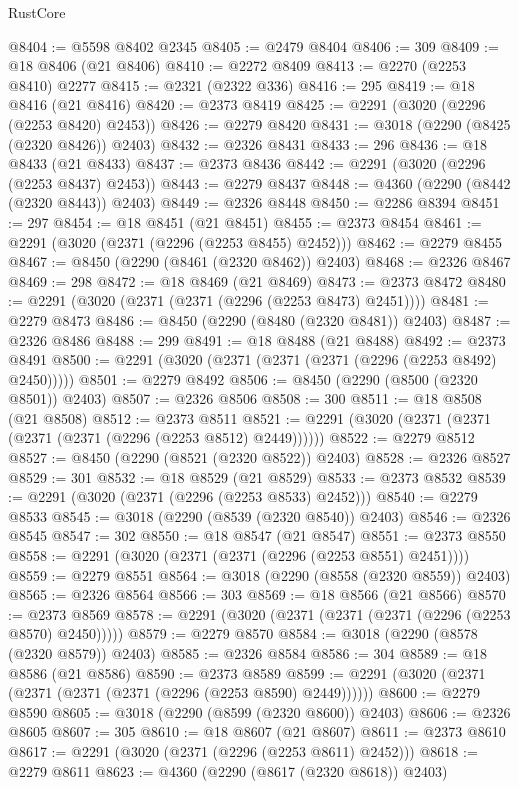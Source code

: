 \begin{lexlean}{RustCore}
\begin{coremodule}
@8404 := @5598 @8402 @2345
@8405 := @2479 @8404
@8406 := 309
@8409 := @18 @8406 (@21 @8406)
@8410 := @2272 @8409
@8413 := @2270 (@2253 @8410) @2277
@8415 := @2321 (@2322 @336)
@8416 := 295
@8419 := @18 @8416 (@21 @8416)
@8420 := @2373 @8419
@8425 := @2291 (@3020 (@2296 (@2253 @8420) @2453))
@8426 := @2279 @8420
@8431 := @3018 (@2290 (@8425 (@2320 @8426)) @2403)
@8432 := @2326 @8431
@8433 := 296
@8436 := @18 @8433 (@21 @8433)
@8437 := @2373 @8436
@8442 := @2291 (@3020 (@2296 (@2253 @8437) @2453))
@8443 := @2279 @8437
@8448 := @4360 (@2290 (@8442 (@2320 @8443)) @2403)
@8449 := @2326 @8448
@8450 := @2286 @8394
@8451 := 297
@8454 := @18 @8451 (@21 @8451)
@8455 := @2373 @8454
@8461 := @2291 (@3020 (@2371 (@2296 (@2253 @8455) @2452)))
@8462 := @2279 @8455
@8467 := @8450 (@2290 (@8461 (@2320 @8462)) @2403)
@8468 := @2326 @8467
@8469 := 298
@8472 := @18 @8469 (@21 @8469)
@8473 := @2373 @8472
@8480 := @2291 (@3020 (@2371 (@2371 (@2296 (@2253 @8473) @2451))))
@8481 := @2279 @8473
@8486 := @8450 (@2290 (@8480 (@2320 @8481)) @2403)
@8487 := @2326 @8486
@8488 := 299
@8491 := @18 @8488 (@21 @8488)
@8492 := @2373 @8491
@8500 := @2291 (@3020 (@2371 (@2371 (@2371 (@2296 (@2253 @8492) @2450)))))
@8501 := @2279 @8492
@8506 := @8450 (@2290 (@8500 (@2320 @8501)) @2403)
@8507 := @2326 @8506
@8508 := 300
@8511 := @18 @8508 (@21 @8508)
@8512 := @2373 @8511
@8521 := @2291 (@3020 (@2371 (@2371 (@2371 (@2371 (@2296 (@2253 @8512) @2449))))))
@8522 := @2279 @8512
@8527 := @8450 (@2290 (@8521 (@2320 @8522)) @2403)
@8528 := @2326 @8527
@8529 := 301
@8532 := @18 @8529 (@21 @8529)
@8533 := @2373 @8532
@8539 := @2291 (@3020 (@2371 (@2296 (@2253 @8533) @2452)))
@8540 := @2279 @8533
@8545 := @3018 (@2290 (@8539 (@2320 @8540)) @2403)
@8546 := @2326 @8545
@8547 := 302
@8550 := @18 @8547 (@21 @8547)
@8551 := @2373 @8550
@8558 := @2291 (@3020 (@2371 (@2371 (@2296 (@2253 @8551) @2451))))
@8559 := @2279 @8551
@8564 := @3018 (@2290 (@8558 (@2320 @8559)) @2403)
@8565 := @2326 @8564
@8566 := 303
@8569 := @18 @8566 (@21 @8566)
@8570 := @2373 @8569
@8578 := @2291 (@3020 (@2371 (@2371 (@2371 (@2296 (@2253 @8570) @2450)))))
@8579 := @2279 @8570
@8584 := @3018 (@2290 (@8578 (@2320 @8579)) @2403)
@8585 := @2326 @8584
@8586 := 304
@8589 := @18 @8586 (@21 @8586)
@8590 := @2373 @8589
@8599 := @2291 (@3020 (@2371 (@2371 (@2371 (@2371 (@2296 (@2253 @8590) @2449))))))
@8600 := @2279 @8590
@8605 := @3018 (@2290 (@8599 (@2320 @8600)) @2403)
@8606 := @2326 @8605
@8607 := 305
@8610 := @18 @8607 (@21 @8607)
@8611 := @2373 @8610
@8617 := @2291 (@3020 (@2371 (@2296 (@2253 @8611) @2452)))
@8618 := @2279 @8611
@8623 := @4360 (@2290 (@8617 (@2320 @8618)) @2403)

\end{coremodule}
\end{lexlean}
